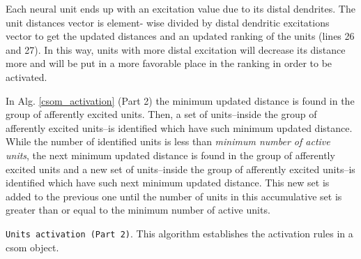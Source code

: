 {Each neural unit ends up with an excitation value due to its distal dendrites. The unit distances vector is element- wise divided by distal dendritic excitations vector to get the updated distances and an updated ranking of the units (lines 26 and 27). In this way, units with more distal excitation will decrease its distance more and will be put in a more favorable place in the ranking in order to be activated.

In Alg. \ref{csom_activation} (Part 2) the minimum updated distance is found in the group of afferently excited units. Then, a set of units--inside the group of afferently excited units--is identified which have such minimum updated distance. While the number of identified units is less than \emph{minimum number of active units}, the next   minimum updated distance is found in the group of afferently excited units and a new set of units--inside the group of afferently excited units--is identified which have such next minimum updated distance. This new set is added to the previous one until the number of units in this accumulative set is greater than or equal to the minimum number of active units.

\begin{algorithm}
\ContinuedFloat
\caption{\texttt{Units activation (Part 2)}. This algorithm establishes the activation rules in a \gls{csom} object.}
\label{csom_activation}
\begin{algorithmic}[1]

	\ENDWHILE


\end{algorithmic}
\end{algorithm}}
